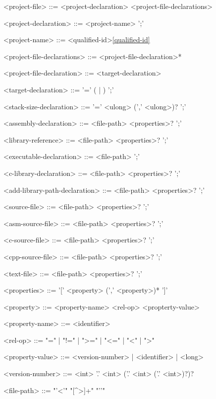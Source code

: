 \documentclass[a4paper,oneside,11pt]{article}
\begin{document}
\begin{grammar}
<project-file> ::= <project-declaration> <project-file-declarations>

<project-declaration> ::=  <project-name> ';'

<project-name> ::= <qualified-id>\ref{qualified-id}

<project-file-declarations> ::= <project-file-declaration>*

<project-file-declaration> ::= <target-declaration>

<target-declaration> ::=  '=' ( | ) ';'

<stack-size-declaration> ::=  '=' <ulong> (',' <ulong>)? ';'

<assembly-declaration> ::=  <file-path> <properties>? ';'

<library-reference> ::=  <file-path> <properties>? ';'

<executable-declaration> ::=  <file-path> ';'

<c-library-declaration> ::=  <file-path> <properties>? ';'

<add-library-path-declaration> ::=  <file-path> <properties>? ';'

<source-file> ::=  <file-path> <properties>? ';'

<asm-source-file> ::=  <file-path> <properties>? ';'

<c-source-file> ::=  <file-path> <properties>? ';'

<cpp-source-file> ::=  <file-path> <properties>? ';'

<text-file> ::=  <file-path> <properties>? ';'

<properties> ::= '[' <property> (',' <property>)* ']'

<property> ::= <property-name> <rel-op> <propterty-value>

<property-name> ::= <identifier>

<rel-op> ::= "=" | "!=" | ">=" | "<=" | "<" | ">"

<property-value> ::= <version-number> | <identifier> | <long>

<version-number> ::= <int> '.' <int> ('.' <int> ('.' <int>)?)?

<file-path> ::= "'<'" "[^>]+" "'\>'"

\end{grammar}
\end{document}

